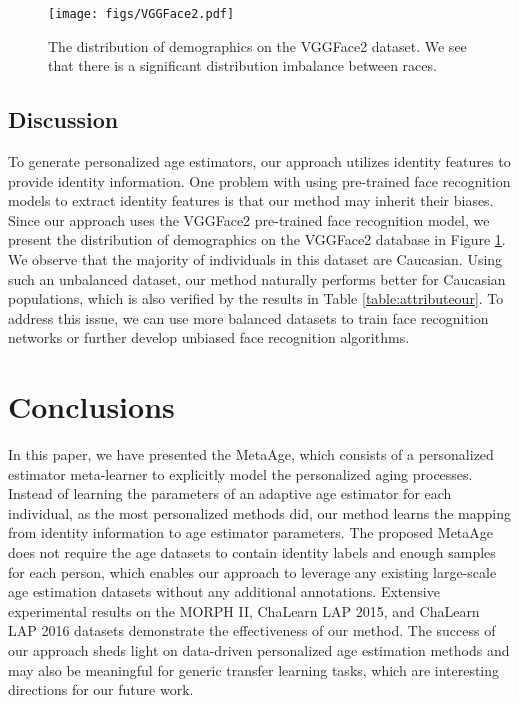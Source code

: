 \documentclass[journal,twoside]{IEEEtran}
\begin{document}
\begin{figure}[t]
  \begin{center}
     \texttt{[image: figs/VGGFace2.pdf]}
  \end{center}
     \caption{The distribution of demographics on the VGGFace2 dataset. We see that there is a significant distribution imbalance between races.}
  \label{fig:vggface2}
\end{figure}


\subsection{Discussion}
To generate personalized age estimators, our approach utilizes identity features to provide identity information. One problem with using pre-trained face recognition models to extract identity features is that our method may inherit their biases. Since our approach uses the VGGFace2 pre-trained face recognition model, we present the distribution of demographics on the VGGFace2 database in Figure \ref{fig:vggface2}. We observe that the majority of individuals in this dataset are Caucasian. Using such an unbalanced dataset, our method naturally performs better for Caucasian populations, which is also verified by the results in Table \ref{table:attributeour}. To address this issue, we can use more balanced datasets to train face recognition networks or further develop unbiased face recognition algorithms.




  


\section{Conclusions}

In this paper, we have presented the MetaAge, which consists of a personalized estimator meta-learner to explicitly model the personalized aging processes. Instead of learning the parameters of an adaptive age estimator for each individual, as the most personalized methods did, our method learns the mapping from identity information to age estimator parameters.
The proposed MetaAge does not require the age datasets to contain identity labels and enough samples for each person,  which enables our approach to leverage any existing large-scale age estimation datasets without any additional annotations. Extensive experimental results on the MORPH II, ChaLearn LAP 2015, and ChaLearn LAP 2016 datasets demonstrate the effectiveness of our method.
The success of our approach sheds light on data-driven personalized age estimation methods and may also be meaningful for generic transfer learning tasks, which are interesting directions for our future work.



{


}



  
  
  






  
  
\end{document}

